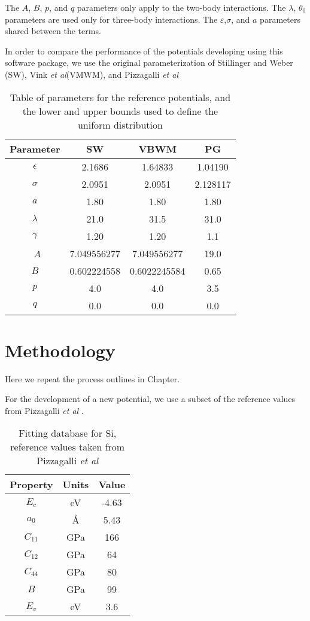 The $A$, $B$, $p$, and $q$ parameters only apply to the two-body interactions.
The $\lambda$, $\theta_0$ parameters are used only for three-body interactions.
The $\varepsilon$,$\sigma$, and $a$ parameters shared between the terms.

In order to compare the performance of the potentials developing using this software package, we use the original parameterization of Stillinger and Weber (SW)\cite{stillinger1985_sw}, Vink \emph{et al}(VMWM)\cite{vink2001_sw_Si}, and Pizzagalli \emph{et al}\cite{pizzagalli2013_sw_Si}

\begin{table}[h]
	\centering
	\caption{Table of parameters for the reference potentials, and the lower and upper bounds used to define the uniform distribution}
	\label{table:sw_parameters_ref}
	\begin{tabular}{c c c c}
		\hline
		Parameter & SW & VBWM & PG \\
		\hline
		$\epsilon$ & 2.1686 & 1.64833 & 1.04190 \\
		$\sigma$ &   2.0951 & 2.0951 & 2.128117 \\
		$a$ &       1.80 & 1.80 & 1.80 \\
		$\lambda$ & 21.0 & 31.5 & 31.0 \\
		$\gamma$ & 1.20 & 1.20 & 1.1 \\\
		$A$ & 7.049556277 & 7.049556277 & 19.0 \\
		$B$ & 0.602224558 & 0.6022245584 & 0.65 \\
		$p$ & 4.0 & 4.0 & 3.5 \\
		$q$ & 0.0 & 0.0 & 0.0 \\
		\hline
	\end{tabular}
\end{table}

\section{Methodology}

Here we repeat the process outlines in Chapter.

For the development of a new potential, we use a subset of the reference values from Pizzagalli \emph{et al} \cite{pizzagalli2013_sw_Si}.

\begin{table}[htbp]
	\centering
	\caption{Fitting database for Si, reference values taken from Pizzagalli \emph{et al}\cite{pizzagalli2013_sw_Si}}
	\label{table:si_fitting_db}
	\begin{tabular}{c c c}
		\hline
		Property & Units & Value \\
		\hline
		$E_c$ 		& eV 	& -4.63 \\
		$a_0$ 		& \AA 	&  5.43 \\
		$C_{11}$ 	& GPa 	& 166 \\
		$C_{12}$ 	& GPa 	& 64 \\
		$C_{44}$ 	& GPa 	& 80 \\
		$B$ 		& GPa 	& 99 \\
		$E_v$ 		& eV 	& 3.6 \\
		\hline
	\end{tabular}
\end{table}

